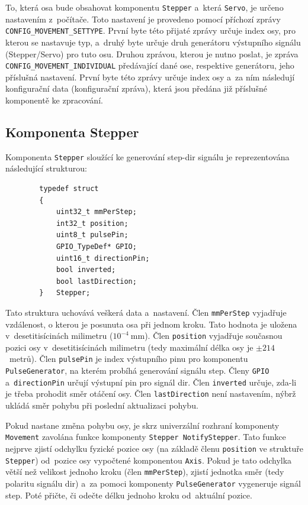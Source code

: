 	To, která osa bude obsahovat komponentu {\tt Stepper} a~která {\tt Servo}, je určeno nastavením z~počítače. Toto nastavení je provedeno pomocí příchozí zprávy {\tt CONFIG\_MOVEMENT\_SETTYPE}. První byte této přijaté zprávy určuje index osy, pro kterou se nastavuje typ, a~druhý byte určuje druh generátoru výstupního signálu (Stepper/Servo) pro tuto osu. Druhou zprávou, kterou je nutno poslat, je zpráva {\tt CONFIG\_MOVEMENT\_INDIVIDUAL} předávající dané ose, respektive generátoru, jeho příslušná nastavení. První byte této zprávy určuje index osy a~za ním následují konfigurační data (konfigurační zpráva), která jsou předána již příslušné komponentě ke zpracování.
	
		\subsection{Komponenta Stepper}
		Komponenta {\tt Stepper} sloužící ke generování step-dir signálu je reprezentována následující strukturou:
		\begin{verbatim}
		typedef struct
		{
		    uint32_t mmPerStep;
		    int32_t position;
		    uint8_t pulsePin;
		    GPIO_TypeDef* GPIO;
		    uint16_t directionPin;
		    bool inverted;
		    bool lastDirection;
		}	Stepper;
		\end{verbatim}
		Tato struktura uchovává veškerá data a~nastavení. Člen {\tt mmPerStep} vyjadřuje vzdálenost, o kterou je posunuta osa při jednom kroku. Tato hodnota je uložena v~desetitisícinách milimetru ($10^{-4}~$mm). Člen {\tt position} vyjadřuje současnou pozici osy v~desetitisícinách milimetru (tedy maximální délka osy je $\pm214$~metrů). Člen {\tt pulsePin} je index výstupního pinu pro komponentu {\tt PulseGenerator}, na kterém probíhá generování signálu step. Členy {\tt GPIO} a~{\tt directionPin} určují výstupní pin pro signál dir. Člen {\tt inverted} určuje, zda-li je třeba prohodit směr otáčení osy. Člen {\tt lastDirection} není nastavením, nýbrž ukládá směr pohybu při poslední aktualizaci pohybu.
		
		Pokud nastane změna pohybu osy, je skrz univerzální rozhraní komponenty {\tt Movement} zavolána funkce komponenty {\tt Stepper NotifyStepper}. Tato funkce nejprve zjistí odchylku fyzické pozice osy (na základě členu {\tt position} ve struktuře {\tt Stepper}) od~pozice osy vypočtené komponentou {\tt Axis}. Pokud je tato odchylka větší než velikost jednoho kroku (člen {\tt mmPerStep}), zjistí jednotka směr (tedy polaritu signálu dir) a~za pomoci komponenty {\tt PulseGenerator} vygeneruje signál step. Poté přičte, či odečte délku jednoho kroku od~aktuální pozice.
		
